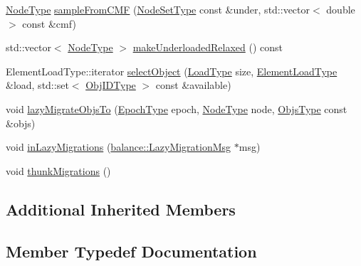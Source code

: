 \begin{DoxyCompactItemize}
\item 
\hyperlink{namespacevt_a866da9d0efc19c0a1ce79e9e492f47e2}{Node\+Type} \hyperlink{structvt_1_1vrt_1_1collection_1_1lb_1_1_gossip_l_b_a1a9e88510b1b61a181c9b4dcb3a8c153}{sample\+From\+C\+MF} (\hyperlink{structvt_1_1vrt_1_1collection_1_1lb_1_1_gossip_l_b_abb53f1d4bd3c37f3e68c3b5b0e1f1c86}{Node\+Set\+Type} const \&under, std\+::vector$<$ double $>$ const \&cmf)
\item 
std\+::vector$<$ \hyperlink{namespacevt_a866da9d0efc19c0a1ce79e9e492f47e2}{Node\+Type} $>$ \hyperlink{structvt_1_1vrt_1_1collection_1_1lb_1_1_gossip_l_b_a8be50d7877433de416d325d44b5e669a}{make\+Underloaded\+Relaxed} () const
\item 
Element\+Load\+Type\+::iterator \hyperlink{structvt_1_1vrt_1_1collection_1_1lb_1_1_gossip_l_b_adafa0d7c3295e095149f48c3027b3173}{select\+Object} (\hyperlink{structvt_1_1vrt_1_1collection_1_1lb_1_1_base_l_b_a215e22b9f12678303f49615ae3be05cc}{Load\+Type} size, \hyperlink{structvt_1_1vrt_1_1collection_1_1lb_1_1_base_l_b_aa286d31a0820a8fc9218ccb858368fca}{Element\+Load\+Type} \&load, std\+::set$<$ \hyperlink{structvt_1_1vrt_1_1collection_1_1lb_1_1_base_l_b_a15a2f756b59c8c2437985206b32aa403}{Obj\+I\+D\+Type} $>$ const \&available)
\item 
void \hyperlink{structvt_1_1vrt_1_1collection_1_1lb_1_1_gossip_l_b_a12cd87d3d0f4c186ffca1b554f5086dc}{lazy\+Migrate\+Objs\+To} (\hyperlink{namespacevt_a985a5adf291c34a3ca263b3378388236}{Epoch\+Type} epoch, \hyperlink{namespacevt_a866da9d0efc19c0a1ce79e9e492f47e2}{Node\+Type} node, \hyperlink{structvt_1_1vrt_1_1collection_1_1lb_1_1_gossip_l_b_ad2093cf08cc6af0f3deb4441e40c55a9}{Objs\+Type} const \&objs)
\item 
void \hyperlink{structvt_1_1vrt_1_1collection_1_1lb_1_1_gossip_l_b_a2fa63a6d2dc211423423b0d7de1d1ed6}{in\+Lazy\+Migrations} (\hyperlink{structvt_1_1vrt_1_1collection_1_1balance_1_1_lazy_migration_msg}{balance\+::\+Lazy\+Migration\+Msg} $\ast$msg)
\item 
void \hyperlink{structvt_1_1vrt_1_1collection_1_1lb_1_1_gossip_l_b_a7693c8b06ab78ef3565687621d810450}{thunk\+Migrations} ()
\end{DoxyCompactItemize}
\subsection*{Additional Inherited Members}


\subsection{Member Typedef Documentation}
\mbox{\label{structvt_1_1vrt_1_1collection_1_1lb_1_1_gossip_l_b_af7170ae946da8af68105109f04824f03}} 
